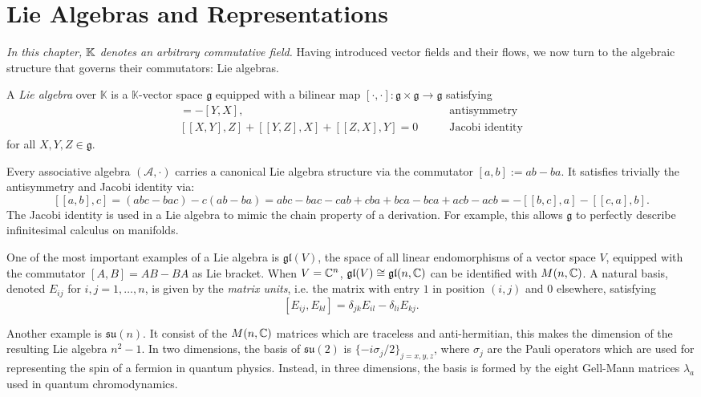 \section{Lie Algebras and Representations}
\textit{In this chapter, $\mathbb{K}$ denotes an arbitrary commutative field.}
\newline Having introduced vector fields and their flows, we now turn to the algebraic structure that governs their commutators: Lie algebras.
\begin{definition}\label{def:lie-algebra}
	A \emph{Lie algebra} over $\mathbb{K}$ is a $\mathbb{K}$-vector space $\mathfrak{g}$ equipped with a bilinear map $[\cdot,\cdot]:\mathfrak{g}\times\mathfrak{g}\to\mathfrak{g}$ satisfying
	\begin{align}
	[X,Y] = -[Y,X], \qquad &\text{antisymmetry} \\
	[[X,Y],Z]+[[Y,Z],X]+[[Z,X],Y]=0 \qquad &\text{Jacobi identity}
	\end{align}
	for all $X,Y,Z\in\mathfrak{g}$. \cite{humphreysIntroductionLieAlgebras2010}
\end{definition}

\begin{remark}
	Every associative algebra $(\mathcal{A},\cdot)$ carries a canonical Lie algebra
	structure via the commutator $[a,b]:=ab-ba$. It satisfies trivially the antisymmetry and Jacobi identity via:
	\[
		[[a,b],c] = (abc - bac) - c(ab - ba) = abc - bac - cab + cba + bca - bca + acb - acb = -[[b,c],a] - [[c,a],b].
	\]
	The Jacobi identity is used in a Lie algebra to mimic the chain property of a derivation. For example, this allows $\mathfrak{g}$ to perfectly describe infinitesimal calculus on manifolds.
\end{remark}

\begin{example}
	One of the most important examples of a Lie algebra is $\mathfrak{gl}(V)$, the space of all linear endomorphisms of a vector space $V$, equipped with the commutator $[A,B] = AB - BA$ as Lie bracket. When $V = \mathbb{C}^n$, $\mathfrak{gl}(V) \cong \mathfrak{gl}(n,\mathbb{C})$ can be identified with $M(n,\mathbb{C})$. A natural basis, denoted $E_{ij}$ for $i,j = 1,\dots,n$, is given by the \textit{matrix units}, i.e. the matrix with entry $1$ in position $(i,j)$ and $0$ elsewhere, satisfying $$[E_{ij}, E_{kl}] = \delta_{jk}E_{il} - \delta_{li}E_{kj}.$$
\end{example}

\begin{example}\label{ex:su-n}
	Another example is $\mathfrak{su}(n)$. It consist of the $M(n, \mathbb{C})$ matrices which are traceless and anti-hermitian, this makes the dimension of the resulting Lie algebra $n^2 -1$. In two dimensions, the basis of $\mathfrak{su}(2)$ is $\{-i\sigma_j/2\}_{j=x,y,z}$, where $\sigma_j$ are the Pauli operators which are used for representing the spin of a fermion in quantum physics. Instead, in three dimensions, the basis is formed by the eight Gell-Mann matrices $\lambda_a$ used in quantum chromodynamics.
\end{example}

